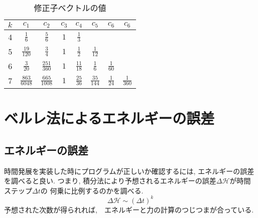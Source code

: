 \begin{table}[hbtp]
  \caption{修正子ベクトルの値}
  \label{tbl:gear-modification-vector}
  \centering
  \begin{tabular}{cccccccc}
    \hline
    $k$ & $c_{1}$ & $c_{2}$ & $c_{3}$ & $c_{4}$ & $c_{5}$ & $c_{6}$ & $c_{6}$\\
    \hline \hline
    4  & $\frac{1}{6}$    & $\frac{5}{6}$     & $1$ & $\frac{1}{3}$   & & & \\
    5  & $\frac{19}{120}$ & $\frac{3}{4}$     & $1$ & $\frac{1}{2}$   & $\frac{1}{12}$ & & \\
    6  & $\frac{3}{20}$  & $\frac{251}{360}$ & $1$ & $\frac{11}{18}$ &  $\frac{1}{6}$ & $\frac{1}{60}$ &\\
    7  & $\frac{863}{6048}$ & $\frac{665}{1008}$ & $1$ & $\frac{25}{36}$ &  $\frac{35}{144}$ & $\frac{1}{24}$ & $\frac{1}{360}$ \\
    \hline
  \end{tabular}
\end{table}

\section{ベルレ法によるエネルギーの誤差}
\subsection{エネルギーの誤差}
時間発展を実装した時にプログラムが正しいか確認するには, エネルギーの誤差を調べると良い.
つまり, 積分法により予想されるエネルギーの誤差$\Delta \mathcal{H}$が時間ステップ$\Delta t$の
何乗に比例するのかを調べる.
\begin{equation}
 \Delta \mathcal{H} \sim (\Delta t)^{k}
\end{equation}
予想された次数が得られれば,　エネルギーと力の計算のつじつまが合っている.

